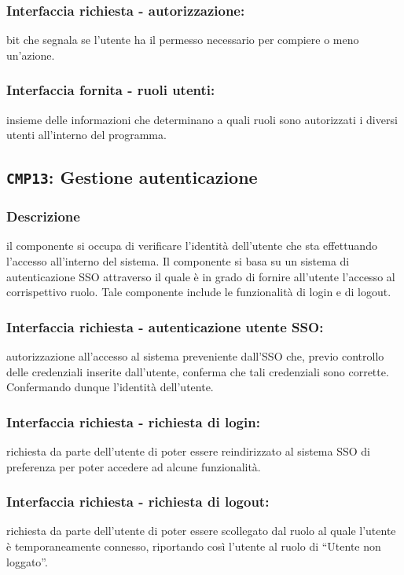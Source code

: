         \subsubsection{Interfaccia richiesta - autorizzazione:}
            bit che segnala se l'utente ha il permesso necessario per compiere o meno un'azione.
        \subsubsection{Interfaccia fornita - ruoli utenti:}
            insieme delle informazioni che determinano a quali ruoli sono autorizzati i diversi utenti all'interno del programma.

    \subsection{\texttt{CMP13}: Gestione autenticazione}
        \subsubsection{Descrizione}
            il componente si occupa di verificare l'identità dell'utente che sta effettuando l'accesso all'interno del sistema. Il componente si basa su un sistema di autenticazione SSO attraverso il quale è in grado di fornire all'utente l'accesso al corrispettivo ruolo. Tale componente include le funzionalità di login e di logout.
        \subsubsection{Interfaccia richiesta - autenticazione utente SSO:}
            autorizzazione all'accesso al sistema preveniente dall'SSO che, previo controllo delle credenziali inserite dall'utente, conferma che tali credenziali sono corrette. Confermando dunque l'identità dell'utente.
        \subsubsection{Interfaccia richiesta - richiesta di login:}
            richiesta da parte dell'utente di poter essere reindirizzato al sistema SSO di preferenza per poter accedere ad alcune funzionalità.
        \subsubsection{Interfaccia richiesta - richiesta di logout:}
            richiesta da parte dell'utente di poter essere scollegato dal ruolo al quale l'utente è temporaneamente connesso, riportando così l'utente al ruolo di ``Utente non loggato''.

